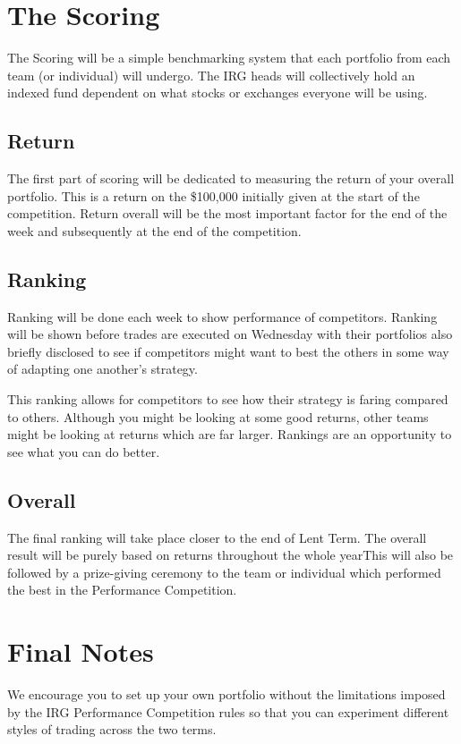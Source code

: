 \documentclass[a4paper]{article}
\begin{document}
{\newpage
\section{The Scoring}
The Scoring will be a simple benchmarking system that each portfolio from each team (or individual) will undergo. The IRG heads will collectively hold an indexed fund dependent on what stocks or exchanges everyone will be using.

\subsection{Return}
The first part of scoring will be dedicated to measuring the return of your overall portfolio. This is a return on the \$100,000 initially given at the start of the competition. Return overall will be the most important factor for the end of the week and subsequently at the end of the competition.

\subsection{Ranking}
Ranking will be done each week to show performance of competitors. Ranking will be shown before trades are executed on Wednesday with their portfolios also briefly disclosed to see if competitors might want to best the others in some way of adapting one another's strategy.

\vspace{10pt}
\noindent This ranking allows for competitors to see how their strategy is faring compared to others. Although you might be looking at some good returns, other teams might be looking at returns which are far larger. Rankings are an opportunity to see what you can do better.

\subsection{Overall}
The final ranking will take place closer to the end of Lent Term. The overall result will be purely based on returns throughout the whole yearThis will also be followed by a prize-giving ceremony to the team or individual which performed the best in the Performance Competition.

\newpage
\section{Final Notes}
We encourage you to set up your own portfolio without the limitations imposed by the IRG Performance Competition rules so that you can experiment different styles of trading across the two terms.

}
\end{document}
